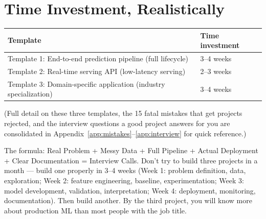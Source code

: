 \section{Time Investment, Realistically}

\begin{longtable}{p{} p{}}
\toprule
\textbf{Template} & \textbf{Time investment} \\
\midrule
\endhead
Template 1: End-to-end prediction pipeline (full lifecycle) & 3--4 weeks \\
Template 2: Real-time serving API (low-latency serving) & 2--3 weeks \\
Template 3: Domain-specific application (industry specialization) & 3--4 weeks \\
\bottomrule
\end{longtable}

\noindent (Full detail on these three templates, the 15 fatal mistakes that get projects rejected, and the
interview questions a good project answers for you are consolidated in Appendix~\ref{app:mistakes}--\ref{app:interview} for quick reference.)

\begin{keytakeaway}
The formula: Real Problem + Messy Data + Full Pipeline + Actual Deployment + Clear Documentation = Interview
Calls. Don't try to build three projects in a month --- build one properly in 3--4 weeks (Week 1: problem
definition, data, exploration; Week 2: feature engineering, baseline, experimentation; Week 3: model development,
validation, interpretation; Week 4: deployment, monitoring, documentation). Then build another. By the third
project, you will know more about production ML than most people with the job title.
\end{keytakeaway}

